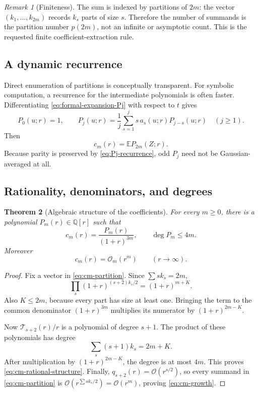 \documentclass[11pt,a4paper]{article}
\newtheorem{theorem}{Theorem}[section]
\theoremstyle{definition}
\theoremstyle{remark}
\newtheorem{remark}[theorem]{Remark}
\newcommand{\Tch}{\mathscr T}
\newcommand{\E}{\mathbb E}
\newcommand{\Q}{\mathbb Q}
\newcommand{\BigO}{\mathcal O}
\begin{document}
\begin{remark}[Finiteness]
The sum is indexed by partitions of \(2m\): the vector
\((k_1,\ldots,k_{2m})\) records \(k_s\) parts of size \(s\).  Therefore the
number of summands is the partition number \(p(2m)\), not an infinite or
asymptotic count.  This is the requested finite coefficient-extraction rule.
\end{remark}

\subsection{A dynamic recurrence}

Direct enumeration of partitions is conceptually transparent.  For symbolic
computation, a recurrence for the intermediate polynomials is often faster.
Differentiating \cref{eq:formal-expansion-Pj} with respect to \(t\) gives
\begin{equation}\label{eq:Pj-recurrence}
 P_0(u;r)=1,
 \qquad
 P_j(u;r)=\frac1j\sum_{s=1}^{j}s\,a_s(u;r)P_{j-s}(u;r)
 \quad(j\ge1).
\end{equation}
Then
\begin{equation}\label{eq:cm-from-P}
 c_m(r)=\E P_{2m}(Z;r).
\end{equation}
Because parity is preserved by \cref{eq:Pj-recurrence}, odd \(P_j\) need not be
Gaussian-averaged at all.

\subsection{Rationality, denominators, and degrees}

\begin{theorem}[Algebraic structure of the coefficients]\label{thm:cm-structure}
For every \(m\ge0\), there is a polynomial \(P_m(r)\in\Q[r]\) such that
\begin{equation}\label{eq:cm-rational-structure}
 c_m(r)=\frac{P_m(r)}{(1+r)^{3m}},
 \qquad
 \deg P_m\le4m.
\end{equation}
Moreover
\begin{equation}\label{eq:cm-growth}
 c_m(r)=\BigO_m(r^m)\qquad(r\to\infty).
\end{equation}
\end{theorem}

\begin{proof}
Fix a vector in \cref{eq:cm-partition}.  Since
\(\sum sk_s=2m\),
\begin{equation}\label{eq:denom-exponent}
 \prod_s(1+r)^{(s+2)k_s/2}
 =(1+r)^{m+K}.
\end{equation}
Also \(K\le2m\), because every part has size at least one.  Bringing the term to
the common denominator \((1+r)^{3m}\) multiplies its numerator by
\((1+r)^{2m-K}\).

Now \(\Tch_{s+2}(r)/r\) is a polynomial of degree \(s+1\).  The product of
these polynomials has degree
\[
 \sum_s(s+1)k_s=2m+K.
\]
After multiplication by \((1+r)^{2m-K}\), the degree is at most \(4m\).
This proves \cref{eq:cm-rational-structure}.  Finally,
\(q_{s+2}(r)=\BigO(r^{s/2})\), so every summand in
\cref{eq:cm-partition} is \(\BigO(r^{\sum sk_s/2})=\BigO(r^m)\), proving
\cref{eq:cm-growth}.
\end{proof}
\end{document}
